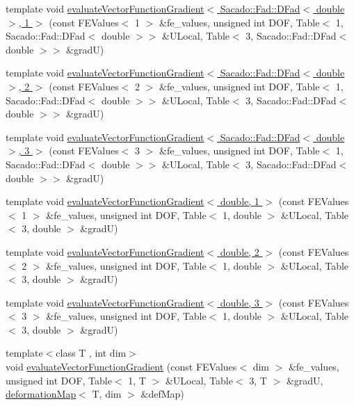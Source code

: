\begin{DoxyCompactItemize}
\item 
template void \hyperlink{function_evaluations_8cc_a4c7ae8f070eed3d1d47ea4ed5dab92f9}{evaluate\-Vector\-Function\-Gradient$<$ Sacado\-::\-Fad\-::\-D\-Fad$<$ double $>$, 1 $>$} (const F\-E\-Values$<$ 1 $>$ \&fe\-\_\-values, unsigned int D\-O\-F, Table$<$ 1, Sacado\-::\-Fad\-::\-D\-Fad$<$ double $>$$>$ \&U\-Local, Table$<$ 3, Sacado\-::\-Fad\-::\-D\-Fad$<$ double $>$$>$ \&grad\-U)
\item 
template void \hyperlink{function_evaluations_8cc_afadde85222d3c01dcc7555e0c47d4aa9}{evaluate\-Vector\-Function\-Gradient$<$ Sacado\-::\-Fad\-::\-D\-Fad$<$ double $>$, 2 $>$} (const F\-E\-Values$<$ 2 $>$ \&fe\-\_\-values, unsigned int D\-O\-F, Table$<$ 1, Sacado\-::\-Fad\-::\-D\-Fad$<$ double $>$$>$ \&U\-Local, Table$<$ 3, Sacado\-::\-Fad\-::\-D\-Fad$<$ double $>$$>$ \&grad\-U)
\item 
template void \hyperlink{function_evaluations_8cc_afdde5bc51307ce007f95ba2af9d138b2}{evaluate\-Vector\-Function\-Gradient$<$ Sacado\-::\-Fad\-::\-D\-Fad$<$ double $>$, 3 $>$} (const F\-E\-Values$<$ 3 $>$ \&fe\-\_\-values, unsigned int D\-O\-F, Table$<$ 1, Sacado\-::\-Fad\-::\-D\-Fad$<$ double $>$$>$ \&U\-Local, Table$<$ 3, Sacado\-::\-Fad\-::\-D\-Fad$<$ double $>$$>$ \&grad\-U)
\item 
template void \hyperlink{function_evaluations_8cc_a960ffa13fae84ece6dc59bc0b91beea3}{evaluate\-Vector\-Function\-Gradient$<$ double, 1 $>$} (const F\-E\-Values$<$ 1 $>$ \&fe\-\_\-values, unsigned int D\-O\-F, Table$<$ 1, double $>$ \&U\-Local, Table$<$ 3, double $>$ \&grad\-U)
\item 
template void \hyperlink{function_evaluations_8cc_a268d56529013650c702d05cd22cf6148}{evaluate\-Vector\-Function\-Gradient$<$ double, 2 $>$} (const F\-E\-Values$<$ 2 $>$ \&fe\-\_\-values, unsigned int D\-O\-F, Table$<$ 1, double $>$ \&U\-Local, Table$<$ 3, double $>$ \&grad\-U)
\item 
template void \hyperlink{function_evaluations_8cc_aae302a9653e837488a7c5989cff31c04}{evaluate\-Vector\-Function\-Gradient$<$ double, 3 $>$} (const F\-E\-Values$<$ 3 $>$ \&fe\-\_\-values, unsigned int D\-O\-F, Table$<$ 1, double $>$ \&U\-Local, Table$<$ 3, double $>$ \&grad\-U)
\item 
{\footnotesize template$<$class T , int dim$>$ }\\void \hyperlink{group___evaluation_functions_ga5adf8aa2d91dbdf393aa91dcc65e42e8}{evaluate\-Vector\-Function\-Gradient} (const F\-E\-Values$<$ dim $>$ \&fe\-\_\-values, unsigned int D\-O\-F, Table$<$ 1, T $>$ \&U\-Local, Table$<$ 3, T $>$ \&grad\-U, \hyperlink{structdeformation_map}{deformation\-Map}$<$ T, dim $>$ \&def\-Map)

\end{DoxyCompactItemize}

